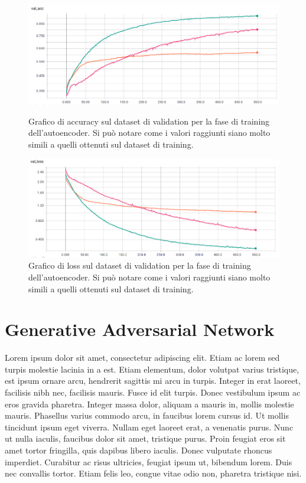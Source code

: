 \begin{figure}[!htbp]
    \centering
    \includegraphics[width=\columnwidth]{figures/autoenc3.png}
    \caption{Grafico di accuracy sul dataset di validation per la fase di training dell'autoencoder. Si può notare come i valori raggiunti siano molto simili a quelli ottenuti sul dataset di training.\label{fig:aut3}}   
    \centering
    \includegraphics[width=\columnwidth]{figures/autoenc4.png}
    \caption{Grafico di loss sul dataset di validation per la fase di training dell'autoencoder. Si può notare come i valori raggiunti siano molto simili a quelli ottenuti sul dataset di training.\label{fig:aut4}}
    
\end{figure}
\section{Generative Adversarial Network}
Lorem ipsum dolor sit amet, consectetur adipiscing elit. Etiam ac lorem sed turpis molestie lacinia in a est. Etiam elementum, dolor volutpat varius tristique, est ipsum ornare arcu, hendrerit sagittis mi arcu in turpis. Integer in erat laoreet, facilisis nibh nec, facilisis mauris. Fusce id elit turpis. Donec vestibulum ipsum ac eros gravida pharetra. Integer massa dolor, aliquam a mauris in, mollis molestie mauris. Phasellus varius commodo arcu, in faucibus lorem cursus id. Ut mollis tincidunt ipsum eget viverra. Nullam eget laoreet erat, a venenatis purus. Nunc ut nulla iaculis, faucibus dolor sit amet, tristique purus. Proin feugiat eros sit amet tortor fringilla, quis dapibus libero iaculis. Donec vulputate rhoncus imperdiet. Curabitur ac risus ultricies, feugiat ipsum ut, bibendum lorem. Duis nec convallis tortor. Etiam felis leo, congue vitae odio non, pharetra tristique nisi.

